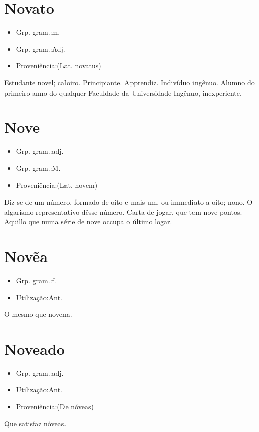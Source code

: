 \section{Novato}
\begin{itemize}
\item {Grp. gram.:m.}
\end{itemize}
\begin{itemize}
\item {Grp. gram.:Adj.}
\end{itemize}
\begin{itemize}
\item {Proveniência:(Lat. \textunderscore novatus\textunderscore )}
\end{itemize}
Estudante novel; caloiro.
Principiante.
Apprendiz.
Indivíduo ingênuo.
Alumno do primeiro anno do qualquer Faculdade da Universidade
Ingênuo, inexperiente.
\section{Nove}
\begin{itemize}
\item {Grp. gram.:adj.}
\end{itemize}
\begin{itemize}
\item {Grp. gram.:M.}
\end{itemize}
\begin{itemize}
\item {Proveniência:(Lat. \textunderscore novem\textunderscore )}
\end{itemize}
Diz-se de um número, formado de oito e mais um, ou immediato a oito; nono.
O algarismo representativo dêsse número.
Carta de jogar, que tem nove pontos.
Aquillo que numa série de nove occupa o último logar.
\section{Novẽa}
\begin{itemize}
\item {Grp. gram.:f.}
\end{itemize}
\begin{itemize}
\item {Utilização:Ant.}
\end{itemize}
O mesmo que \textunderscore novena\textunderscore .
\section{Noveado}
\begin{itemize}
\item {Grp. gram.:adj.}
\end{itemize}
\begin{itemize}
\item {Utilização:Ant.}
\end{itemize}
\begin{itemize}
\item {Proveniência:(De \textunderscore nóveas\textunderscore )}
\end{itemize}
Que satisfaz nóveas.
